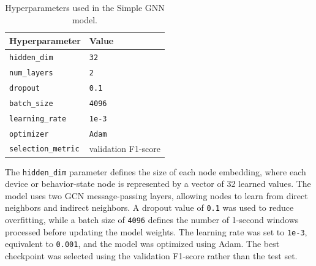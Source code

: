 \documentclass[final,5p,times,twocolumn]{elsarticle}
\begin{document}
\begin{table}[H]
\caption{Hyperparameters used in the Simple GNN model.}
\centering
\small
\renewcommand{\arraystretch}{1.25}
\begin{tabular}{ll}
\hline
\textbf{Hyperparameter} & \textbf{Value} \\ \hline
\texttt{hidden\_dim} & \texttt{32} \\
\texttt{num\_layers} & \texttt{2} \\
\texttt{dropout} & \texttt{0.1} \\
\texttt{batch\_size} & \texttt{4096} \\
\texttt{learning\_rate} & \texttt{1e-3} \\
\texttt{optimizer} & \texttt{Adam} \\
\texttt{selection\_metric} & validation F1-score \\ \hline
\end{tabular}
\label{tab:simple_gnn_hyperparameters}
\end{table}

The \texttt{hidden\_dim} parameter defines the size of each node embedding, where each device or behavior-state node is represented by a vector of 32 learned values. The model uses two GCN message-passing layers, allowing nodes to learn from direct neighbors and indirect neighbors. A dropout value of \texttt{0.1} was used to reduce overfitting, while a batch size of \texttt{4096} defines the number of 1-second windows processed before updating the model weights. The learning rate was set to \texttt{1e-3}, equivalent to \texttt{0.001}, and the model was optimized using Adam. The best checkpoint was selected using the validation F1-score rather than the test set.



\begin{table}[H]
\centering
\caption{Simple GNN epoch sensitivity on the held-out test set.}
\label{tab:simple_gnn_epoch_sensitivity}
\end{table}
\end{document}
